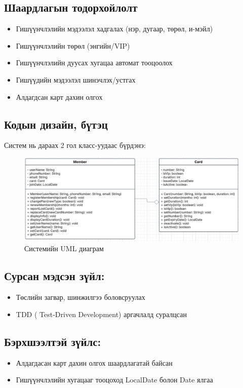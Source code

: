 \documentclass[a4paper, 11pt]{article}
\begin{document}
\subsection*{Шаардлагын тодорхойлолт}
\begin{itemize}
\item Гишүүнчлэлийн мэдээлэл хадгалах (нэр, дугаар, төрөл, и-мэйл)
\item Гишүүнчлэлийн төрөл (энгийн/VIP)
\item Гишүүнчлэлийн дуусах хугацаа автомат тооцоолох
\item Гишүүдийн мэдээлэл шинэчлэх/устгах
\item Алдагдсан карт дахин олгох 
\end{itemize}
\subsection*{Кодын дизайн, бүтэц}
Систем нь дараах 2 гол класс-уудаас бүрдэнэ:

\begin{figure}[h!]
    \centering
    \includegraphics[width=1\linewidth]{umldiagram.png}
    \caption{Системийн UML диаграм}
    
\end{figure}

\subsection*{Сурсан мэдсэн зүйл: }
\begin{itemize}
\item Төслийн загвар, шинжилгээ боловсруулах
\item TDD ( Test-Driven Development) аргачлалд суралцсан
\end{itemize}
\subsection*{Бэрхшээлтэй зүйлс: }
\begin{itemize}
\item Алдагдасан карт дахин олгох шаардлагатай байсан
\item Гишүүнчлэлийн хугацааг тооцоход LocalDate болон Date ялгаа
\end{itemize}
\end{document}
